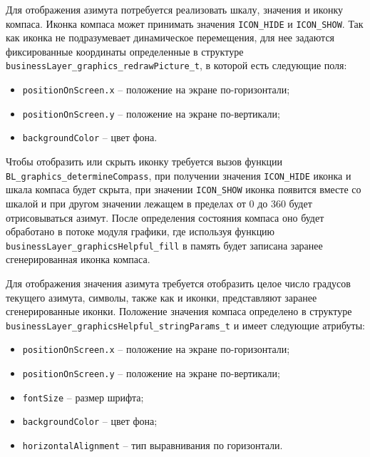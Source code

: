 Для отображения азимута потребуется реализовать шкалу, значения и иконку компаса. Иконка компаса может принимать значения \lstinline{ICON_HIDE} и \lstinline{ICON_SHOW}.
Так как иконка не подразумевает динамическое перемещения, для нее задаются фиксированные координаты определенные в структуре \lstinline{businessLayer_graphics_redrawPicture_t}, в которой есть следующие поля:

\begin{itemize}
    \item \lstinline{positionOnScreen.x} -- положение на экране по-горизонтали;
    \item \lstinline{positionOnScreen.y} -- положение на экране по-вертикали;
    \item \lstinline{backgroundColor} -- цвет фона.
\end{itemize}

Чтобы отобразить или скрыть иконку требуется вызов функции \lstinline{BL_graphics_determineCompass}, при получении значения \lstinline{ICON_HIDE} иконка и шкала компаса
будет скрыта, при значении \lstinline{ICON_SHOW} иконка появится вместе со шкалой и при другом значении лежащем в пределах от 0 до 360 будет отрисовываться азимут.
После определения состояния компаса оно будет обработано в потоке модуля графики, где используя функцию \lstinline{businessLayer_graphicsHelpful_fill} в память будет записана заранее сгенерированная иконка компаса.

Для отображения значения азимута требуется отобразить целое число градусов текущего азимута, символы, также как и иконки, представляют заранее сгенерированные иконки. Положение
значения компаса определено в структуре \lstinline{businessLayer_graphicsHelpful_stringParams_t} и имеет следующие атрибуты:

\begin{itemize}
    \item \lstinline{positionOnScreen.x} -- положение на экране по-горизонтали;
    \item \lstinline{positionOnScreen.y} -- положение на экране по-вертикали;
    \item \lstinline{fontSize} -- размер шрифта;
    \item \lstinline{backgroundColor} -- цвет фона;
    \item \lstinline{horizontalAlignment} -- тип выравнивания по горизонтали.
\end{itemize}

